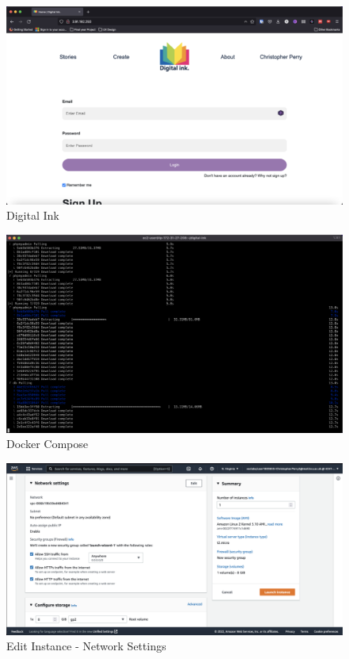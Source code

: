 \begin{figure}[H]
    \centering
        \includegraphics[width=\textwidth]{resources/digital-ink.png}
    \caption{Digital Ink}
    \label{fig:digital-ink}
\end{figure}

\begin{figure}[H]
    \centering
        \includegraphics[width=\textwidth]{resources/ec2/docker-compose}
    \caption{Docker Compose}
    \label{fig:docker-compose}
\end{figure}

\begin{figure}[H]
    \centering
        \includegraphics[width=\textwidth]{resources/edit-instance-network-settings.png}
    \caption{Edit Instance - Network Settings}
    \label{fig:edit-instance-network-settings}
\end{figure}

